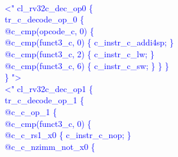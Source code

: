 \textcolor{blue}{
\\
\noindent \textless" cl\_rv32c\_dec\_op0 \{\\%
\indent tr\_c\_decode\_op\_0 \{\\%
\indent \hspace{\parindent}	@c\_cmp(opcode\_c, 0) \{\\%
\indent \hspace{\parindent}	\hspace{\parindent}	@c\_cmp(funct3\_c, 0) \{ c\_instr\_c\_addi4sp; \}\\%
\indent \hspace{\parindent}	\hspace{\parindent}	@c\_cmp(funct3\_c, 2) \{ c\_instr\_c\_lw; \}\\%
\indent \hspace{\parindent}	\hspace{\parindent}	@c\_cmp(funct3\_c, 6) \{ c\_instr\_c\_sw; \} \} \}\\%
\} "\textgreater\\%
\newpage
\noindent \textless" cl\_rv32c\_dec\_op1 \{\\%
\indent tr\_c\_decode\_op\_1 \{\\%
\indent \hspace{\parindent} @c\_c\_op\_1 \{\\%
\indent \hspace{\parindent} \hspace{\parindent}	@c\_cmp(funct3\_c, 0) \{\\%
\indent \hspace{\parindent} \hspace{\parindent}	\hspace{\parindent}	@c\_c\_rs1\_x0 \{ c\_instr\_c\_nop; \}\\%
\indent \hspace{\parindent} \hspace{\parindent}	\hspace{\parindent}	@c\_c\_nzimm\_not\_x0 \{\\%
}
